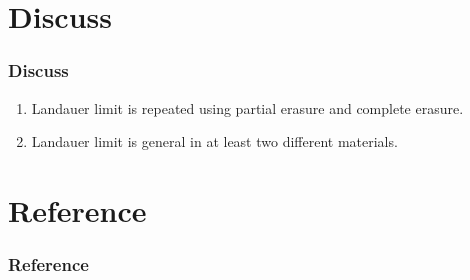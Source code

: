 \documentclass[aspectratio=169,10pt]{beamer}
\begin{document}
\section{Discuss}
\begin{frame}
    \frametitle{Discuss}
    \begin{enumerate}
        \item Landauer limit is repeated using partial erasure and complete erasure.
        \item Landauer limit is general in at least two different materials.
    \end{enumerate}
\end{frame}
\section{Reference}
\begin{frame}[allowframebreaks]
    \frametitle{Reference}
    \printbibliography
\end{frame}
\begin{frame}
\end{frame}
\end{document}
